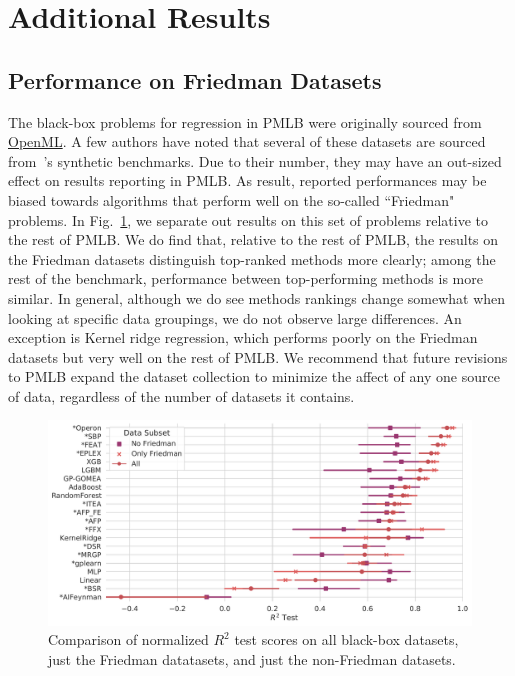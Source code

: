 \section{Additional Results}

\subsection{Performance on Friedman Datasets}

The black-box problems for regression in PMLB were originally sourced from \href{www.openml.org}{OpenML}. 
A few authors have noted that several of these datasets are sourced from~\citet{friedmanGreedyFunctionApproximation2001}'s synthetic benchmarks. 
Due to their number, they may have an out-sized effect on results reporting in PMLB. 
As result, reported performances may be biased towards algorithms that perform well on the so-called ``Friedman" problems. 
In Fig.~\ref{fig:friedman}, we separate out results on this set of problems relative to the rest of PMLB. 
We do find that, relative to the rest of PMLB, the results on the Friedman datasets distinguish top-ranked methods more clearly; among the rest of the benchmark, performance between top-performing methods is more similar. 
In general, although we do see methods rankings change somewhat when looking at specific data groupings, we do not observe large differences. 
An exception is Kernel ridge regression, which performs poorly on the Friedman datasets but very well on the rest of PMLB.
We recommend that future revisions to PMLB expand the dataset collection to minimize the affect of any one source of data, regardless of the number of datasets it contains.

\begin{figure}
\includegraphics[width=\textwidth]{figs/results_pmlb_r1/friedman_comparison_pairgrid-pointplot_r2_test.pdf}

    \caption{
        Comparison of normalized $R^2$ test scores on all black-box datasets, just the Friedman datatasets, and just the non-Friedman datasets.
    }
    \label{fig:friedman}
\end{figure}


